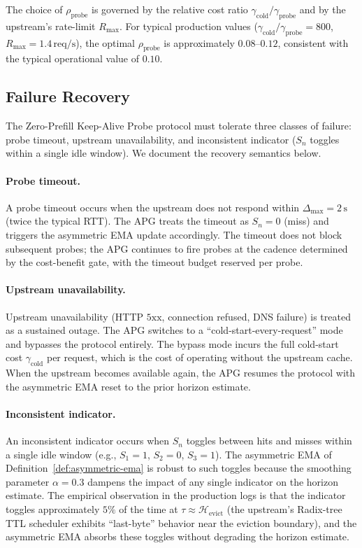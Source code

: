 The choice of $\rho_{\text{probe}}$ is governed by the relative cost
ratio $\gamma_{\text{cold}} / \gamma_{\text{probe}}$ and by the
upstream's rate-limit $R_{\max}$. For typical production values
($\gamma_{\text{cold}} / \gamma_{\text{probe}} = 800$, $R_{\max} =
1.4\,\text{req/s}$), the optimal $\rho_{\text{probe}}$ is
approximately $0.08$--$0.12$, consistent with the typical operational
value of $0.10$.


\subsection{Failure Recovery}

The Zero-Prefill Keep-Alive Probe protocol must tolerate three classes
of failure: probe timeout, upstream unavailability, and inconsistent
indicator ($S_n$ toggles within a single idle window). We document
the recovery semantics below.

\paragraph{Probe timeout.}
A probe timeout occurs when the upstream does not respond within
$\Delta_{\max} = 2\,\text{s}$ (twice the typical RTT). The APG
treats the timeout as $S_n = 0$ (miss) and triggers the asymmetric
EMA update accordingly. The timeout does not block subsequent probes;
the APG continues to fire probes at the cadence determined by the
cost-benefit gate, with the timeout budget reserved per probe.

\paragraph{Upstream unavailability.}
Upstream unavailability (HTTP $5\text{xx}$, connection refused, DNS
failure) is treated as a sustained outage. The APG switches to a
``cold-start-every-request'' mode and bypasses the protocol
entirely. The bypass mode incurs the full cold-start cost
$\gamma_{\text{cold}}$ per request, which is the cost of operating
without the upstream cache. When the upstream becomes available
again, the APG resumes the protocol with the asymmetric EMA reset
to the prior horizon estimate.

\paragraph{Inconsistent indicator.}
An inconsistent indicator occurs when $S_n$ toggles between hits and
misses within a single idle window (e.g., $S_1 = 1$, $S_2 = 0$,
$S_3 = 1$). The asymmetric EMA of
Definition~\ref{def:asymmetric-ema} is robust to such toggles because
the smoothing parameter $\alpha = 0.3$ dampens the impact of any
single indicator on the horizon estimate. The empirical observation
in the production logs is that the indicator toggles
approximately $5\%$ of the time at $\tau \approx \mathcal{H}_{\text{evict}}$
(the upstream's Radix-tree TTL scheduler exhibits ``last-byte''
behavior near the eviction boundary), and the asymmetric EMA
absorbs these toggles without degrading the horizon estimate.

